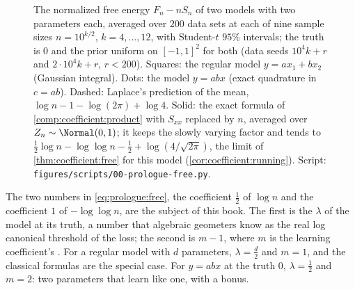 \begin{refsection}
\begin{figure}[t]
\centering
{}
\caption{The normalized free energy $F_n-nS_n$ of two models with two parameters each, averaged over $200$ data sets at each of nine sample sizes $n=10^{k/2}$, $k=4,\dots,12$, with Student-$t$ $95\%$ intervals; the truth is $0$ and the prior uniform on $[-1,1]^2$ for both (data seeds $10^4k+r$ and $2\cdot10^4k+r$, $r<200$). Squares: the regular model $y=ax_1+bx_2$ (Gaussian integral). Dots: the model $y=abx$ (exact quadrature in $c=ab$). Dashed: Laplace's prediction of the mean, $\log n-1-\log(2\pi)+\log4$. Solid: the exact formula of \cref{comp:coefficient:product} with $S_{xx}$ replaced by $n$, averaged over $Z_n\sim\Normal(0,1)$; it keeps the slowly varying factor and tends to $\tfrac12\log n-\log\log n-\tfrac12+\log(4/\sqrt{2\pi})$, the limit of \cref{thm:coefficient:free} for this model (\cref{cor:coefficient:running}). Script: \texttt{figures/scripts/00-prologue-free.py}.}\label{fig:prologue:free}
\end{figure}

The two numbers in \eqref{eq:prologue:free}, the coefficient $\tfrac12$ of $\log n$ and the coefficient $1$ of $-\log\log n$, are the subject of this book. The first is the  $\lambda$ of the model at its truth, a number that algebraic geometers know as the real log canonical threshold of the loss; the second is $m-1$, where $m$ is the learning coefficient's . For a regular model with $d$ parameters, $\lambda=\tfrac d2$ and $m=1$, and the classical formulas are the special case. For $y=abx$ at the truth $0$, $\lambda=\tfrac12$ and $m=2$: two parameters that learn like one, with a bonus.


\end{refsection}
